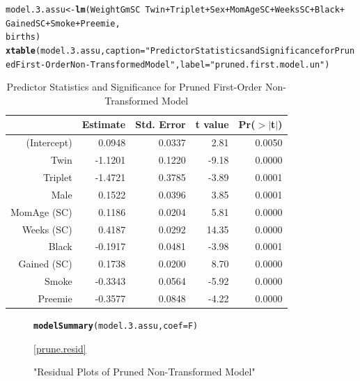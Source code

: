 \documentclass{article}\usepackage[]{graphicx}\usepackage[]{xcolor}
\makeatletter
\newcommand{\hlstr}[1]{\textcolor[rgb]{0.192,0.494,0.8}{#1}}%
\newcommand{\hlopt}[1]{\textcolor[rgb]{0,0,0}{#1}}%
\newcommand{\hlstd}[1]{\textcolor[rgb]{0.345,0.345,0.345}{#1}}%
\newcommand{\hlkwb}[1]{\textcolor[rgb]{0.69,0.353,0.396}{#1}}%
\newcommand{\hlkwc}[1]{\textcolor[rgb]{0.333,0.667,0.333}{#1}}%
\newcommand{\hlkwd}[1]{\textcolor[rgb]{0.737,0.353,0.396}{\textbf{#1}}}%
\newenvironment{kframe}{%
 \def\at@end@of@kframe{}%
 \ifinner\ifhmode%
  \def\at@end@of@kframe{\end{minipage}}%
  \begin{minipage}{\columnwidth}%
 \fi\fi%
 \def\FrameCommand##1{\hskip\@totalleftmargin \hskip-\fboxsep
 \colorbox{shadecolor}{##1}\hskip-\fboxsep
     \hskip-\linewidth \hskip-\@totalleftmargin \hskip\columnwidth}%
 \MakeFramed {\advance\hsize-\width
   \@totalleftmargin\z@ \linewidth\hsize
   \@setminipage}}%
 {\par\unskip\endMakeFramed%
 \at@end@of@kframe}
\newenvironment{knitrout}{}{} %
\makeatother
\begin{document}
\begin{knitrout}
\color{fgcolor}\begin{kframe}
\begin{alltt}
\hlstd{model.3.assu} \hlkwb{<-} \hlkwd{lm}\hlstd{(WeightGmSC} \hlopt{~} \hlstd{Twin} \hlopt{+} \hlstd{Triplet} \hlopt{+} \hlstd{Sex} \hlopt{+} \hlstd{MomAgeSC} \hlopt{+} \hlstd{WeeksSC} \hlopt{+} \hlstd{Black} \hlopt{+}
                      \hlstd{GainedSC} \hlopt{+} \hlstd{Smoke} \hlopt{+} \hlstd{Preemie,}
                    \hlstd{births)}
\hlkwd{xtable}\hlstd{(model.3.assu,} \hlkwc{caption}\hlstd{=}\hlstr{"Predictor Statistics and Significance for Pruned First-Order Non-Transformed Model"}\hlstd{,} \hlkwc{label}\hlstd{=}\hlstr{"pruned.first.model.un"}\hlstd{)}
\end{alltt}
\end{kframe}
\end{knitrout}
\begin{table}[H]
\centering
\begin{tabular}{rrrrr}
  \hline
 & Estimate & Std. Error & t value & Pr($>$$|$t$|$) \\ 
  \hline
(Intercept) & 0.0948 & 0.0337 & 2.81 & 0.0050 \\ 
  Twin & -1.1201 & 0.1220 & -9.18 & 0.0000 \\ 
  Triplet & -1.4721 & 0.3785 & -3.89 & 0.0001 \\ 
  Male & 0.1522 & 0.0396 & 3.85 & 0.0001 \\ 
  MomAge (SC) & 0.1186 & 0.0204 & 5.81 & 0.0000 \\ 
  Weeks (SC) & 0.4187 & 0.0292 & 14.35 & 0.0000 \\ 
  Black & -0.1917 & 0.0481 & -3.98 & 0.0001 \\ 
  Gained (SC) & 0.1738 & 0.0200 & 8.70 & 0.0000 \\ 
  Smoke & -0.3343 & 0.0564 & -5.92 & 0.0000 \\ 
  Preemie & -0.3577 & 0.0848 & -4.22 & 0.0000 \\ 
   \hline
\end{tabular}
\caption{Predictor Statistics and Significance for Pruned First-Order Non-Transformed Model} 
\label{pruned.first.model.un}
\end{table}

\begin{figure}
\begin{knitrout}
\color{fgcolor}\begin{kframe}
\begin{alltt}
\hlkwd{modelSummary}\hlstd{(model.3.assu,} \hlkwc{coef}\hlstd{=F)}
\end{alltt}
\end{kframe}
\end{knitrout}
\caption{"Residual Plots of Pruned Non-Transformed Model"}
\ref{prune.resid}
\end{figure}
\end{document}
